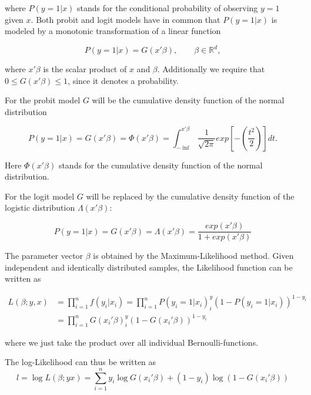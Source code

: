 \documentclass{article}
\begin{document}
where $P(y=1|x)$ stands for the conditional probability of observing $y=1$ given $x$. Both probit and logit models have in common that $P(y=1|x)$ is modeled by a monotonic transformation of a linear function

\begin{equation}
P(y=1|x) = G(x \prime \beta), \qquad \beta \in \mathbb{R}^d,
\end{equation}

where $x \prime \beta$ is the scalar product of $x$ and $\beta$. Additionally we require that $0 \leq G(x \prime \beta) \leq 1$, since it denotes a probability.

For the probit model $G$ will be the cumulative density function of the normal distribution

\begin{equation}
P(y=1|x) = G(x \prime \beta) = \Phi(x \prime \beta) = \int_{-\inf}^{x \prime \beta} \frac{1}{\sqrt{2\pi}}exp\left[-(\frac{t^2}{2})\right]dt.
\end{equation}

Here $\Phi(x \prime \beta)$ stands for the cumulative density function of the normal distribution.

For the logit model $G$ will be replaced by the cumulative density function of the logistic distribution $\Lambda(x \prime \beta)$:

\begin{equation}
P(y=1|x) = G(x \prime \beta) = \Lambda(x \prime \beta) = \frac{exp(x \prime \beta)}{1+exp(x \prime \beta)}
\end{equation}

The parameter vector $\beta$ is obtained by the Maximum-Likelihood method. Given independent and identically distributed samples, the Likelihood function can be written as

\begin{equation}
\begin{split}
L(\beta;y, x) &= \prod_{i=1}^{n} f(y_i | x_i)
              =\prod_{i=1}^{n} P(y_i=1|x_i)^y_i\left(1-P(y_i=1|x_i)\right)^{1-y_i} \\
            & =\prod_{i=1}^{n} G(x_i\prime \beta)^y_i\left(1-G(x_i\prime \beta)\right)^{1-y_i}
\end{split}
\end{equation}

where we just take the product over all individual Bernoulli-functions.

The log-Likelihood can thus be written as
\begin{equation}
\label{logL}
l = \log L(\beta;y x) = \sum_{i=1}^{n} y_i \log G(x_i\prime \beta) +(1-y_i) \log (1-G(x_i\prime \beta))
\end{equation}
\end{document}
